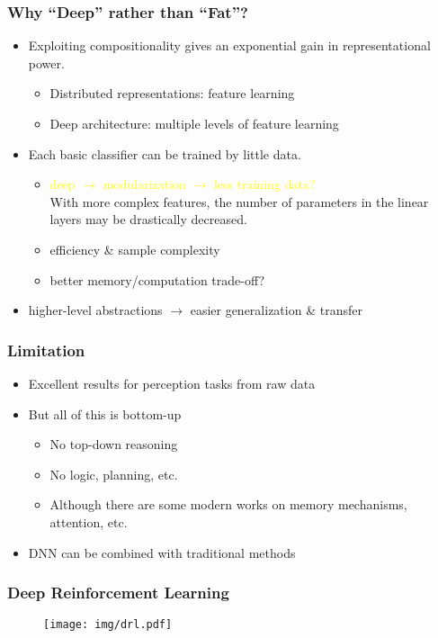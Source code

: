 \documentclass[UTF8,11pt,colorlinks,compress,openany]{beamer}%
\begin{document}
\begin{frame}\frametitle{Why ``Deep'' rather than ``Fat''?}	
	\begin{itemize}
		\item Exploiting compositionality gives an exponential gain in representational power.
		\begin{itemize}
			\item Distributed representations: feature learning
			\item Deep architecture: multiple levels of feature learning
		\end{itemize}
		\item Each basic classifier can be trained by little data.
		\begin{itemize}
			\item \textcolor{yellow}{deep $\to$ modularization $\to$ less training data?}\\
			With more complex features, the number of parameters in the linear layers may be drastically decreased.
			\item efficiency \& sample complexity
			\item better memory/computation trade-off?
		\end{itemize}
		\item higher-level abstractions $\to$ easier generalization \& transfer
	\end{itemize}
\end{frame}

\begin{frame}\frametitle{Limitation}
\begin{itemize}
	\item Excellent results for perception tasks from raw data
	\item But all of this is bottom-up
	\begin{itemize}
		\item No top-down reasoning
		\item No logic, planning, etc.
		\item Although there are some modern works on memory mechanisms, attention, etc.
	\end{itemize}
	\item DNN can be combined with traditional methods
\end{itemize}
\end{frame}

\begin{frame}\frametitle{Deep Reinforcement Learning}
\begin{figure}[H]
\texttt{[image: img/drl.pdf]}
\end{figure}
\end{frame}
\end{document}
